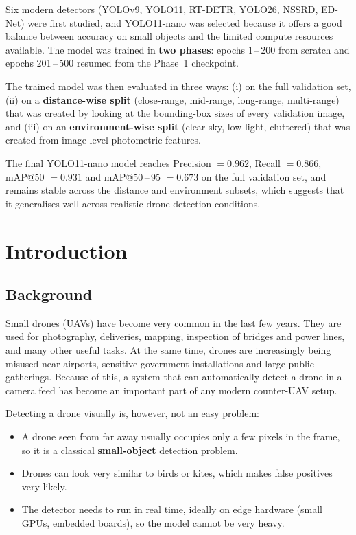 \documentclass[12pt,a4paper]{report}
\begin{document}
Six modern detectors (YOLOv9, YOLO11, RT-DETR, YOLO26, NSSRD, ED-Net) were first studied, and YOLO11-nano was selected because it offers a good balance between accuracy on small objects and the limited compute resources available. The model was trained in \textbf{two phases}: epochs 1\,--\,200 from
scratch and epochs 201\,--\,500 resumed from the Phase~1 checkpoint.

The trained model was then evaluated in three ways: (i) on the full validation
set, (ii) on a \textbf{distance-wise split} (close-range, mid-range, long-range,
multi-range) that was created by looking at the bounding-box sizes of every
validation image, and (iii) on an \textbf{environment-wise split} (clear sky,
low-light, cluttered) that was created from image-level photometric features.

The final YOLO11-nano model reaches Precision $= 0.962$, Recall $= 0.866$,
mAP@50 $= 0.931$ and mAP@50\,--\,95 $= 0.673$ on the full validation set, and
remains stable across the distance and environment subsets, which suggests that
it generalises well across realistic drone-detection conditions.

\newpage

\thispagestyle{plain}
\tableofcontents
\thispagestyle{plain}
\newpage

\chapter{Introduction}

\section{Background}
Small drones (UAVs) have become very common in the last few years. They are used
for photography, deliveries, mapping, inspection of bridges and power lines, and
many other useful tasks. At the same time, drones are increasingly being misused
near airports, sensitive government installations and large public gatherings.
Because of this, a system that can automatically detect a drone in a camera feed
has become an important part of any modern counter-UAV setup.

Detecting a drone visually is, however, not an easy problem:
\begin{itemize}[noitemsep]
    \item A drone seen from far away usually occupies only a few pixels in the
          frame, so it is a classical \textbf{small-object} detection problem.
    \item Drones can look very similar to birds or kites, which makes false
          positives very likely.
    \item The detector needs to run in real time, ideally on edge hardware
          (small GPUs, embedded boards), so the model cannot be very heavy.
\end{itemize}
\end{document}

